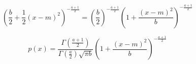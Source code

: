 \documentclass[12pt]{article}
\begin{document}
        \begin{equation}
              \left( \frac{b}{2} + \frac{1}{2} (x-m)^2\right)^{-\frac{a+1}{2}} = \left (\frac{b}{2} \right)^{-\frac{a+1}{2}} \left( 1 + \frac{(x-m)^2}{b} \right)^{-\frac{a+1}{2}}
        \end{equation}

        \begin{equation}
              p(x) = \frac{\Gamma \left( \frac{a+1}{2}\right)}{\Gamma(\frac{a}{2})\sqrt{\pi b}} \left (1 + \frac{(x-m)^2}{b}\right)^{-\frac{a+1}{2}}
        \end{equation}
\end{document}
